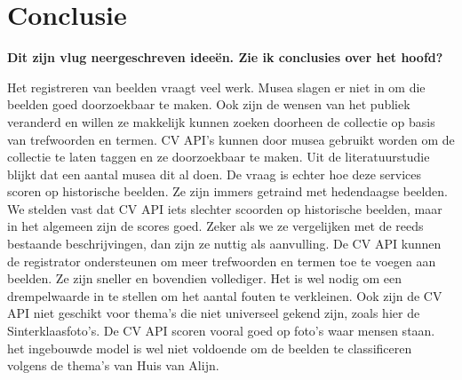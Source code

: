 
\chapter{Conclusie}
\label{ch:conclusie}


\textbf{Dit zijn vlug neergeschreven ideeën. Zie ik conclusies over het hoofd?}

Het registreren van beelden vraagt veel werk. Musea slagen er niet in om die beelden goed doorzoekbaar te maken.
Ook zijn de wensen van het publiek veranderd en willen ze makkelijk kunnen zoeken doorheen de collectie op basis van trefwoorden en termen.
CV API's kunnen door musea gebruikt worden om de collectie te laten taggen en ze doorzoekbaar te maken. Uit de literatuurstudie blijkt dat een aantal musea dit al doen.
De vraag is echter hoe deze services scoren op historische beelden. Ze zijn immers getraind met hedendaagse beelden.
We stelden vast dat CV API iets slechter scoorden op historische beelden, maar in het algemeen zijn de scores goed. Zeker als we ze vergelijken met de reeds bestaande beschrijvingen, dan zijn ze nuttig als aanvulling. De CV API kunnen de registrator ondersteunen om meer trefwoorden en termen toe te voegen aan beelden. Ze zijn sneller en bovendien vollediger. 
Het is wel nodig om een drempelwaarde in te stellen om het aantal fouten te verkleinen. Ook zijn de CV API niet geschikt voor thema's die niet universeel gekend zijn, zoals hier de Sinterklaasfoto's. De CV API scoren vooral goed op foto's waar mensen staan.
het ingebouwde model is wel niet voldoende om de beelden te classificeren volgens de thema's van Huis van Alijn.

